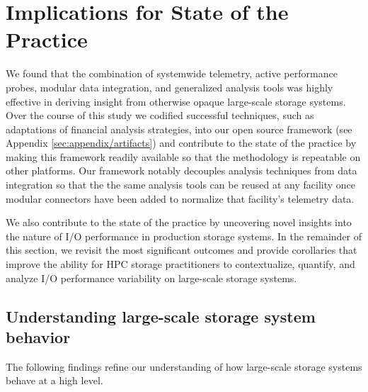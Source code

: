 \section{Implications for State of the Practice}
\label{sec:findings}

We found that the combination of systemwide telemetry, active performance
probes, modular data integration, and generalized analysis
tools was highly effective in deriving insight from otherwise
opaque large-scale storage systems.  Over the course of this study we
codified successful techniques, such as adaptations of financial analysis
strategies, into our open source \tokio framework
(see Appendix \ref{sec:appendix/artifacts}) and contribute to the state of
the practice by making this framework
readily available so that the methodology is repeatable on other platforms.  Our framework notably
decouples analysis techniques from data integration so that the
the same analysis tools can be reused at any facility once modular
connectors have been added to normalize that facility's telemetry data.

We also contribute to the state of the practice by uncovering novel
insights into the nature of I/O performance in production storage systems.
In the remainder of this section, we revisit the most significant outcomes and
provide corollaries that improve the ability for HPC storage practitioners
to contextualize, quantify, and analyze I/O performance variability on
large-scale storage systems.

\subsection{Understanding large-scale storage system behavior}

The following findings  refine our understanding of how large-scale storage
systems behave at a high level. 

